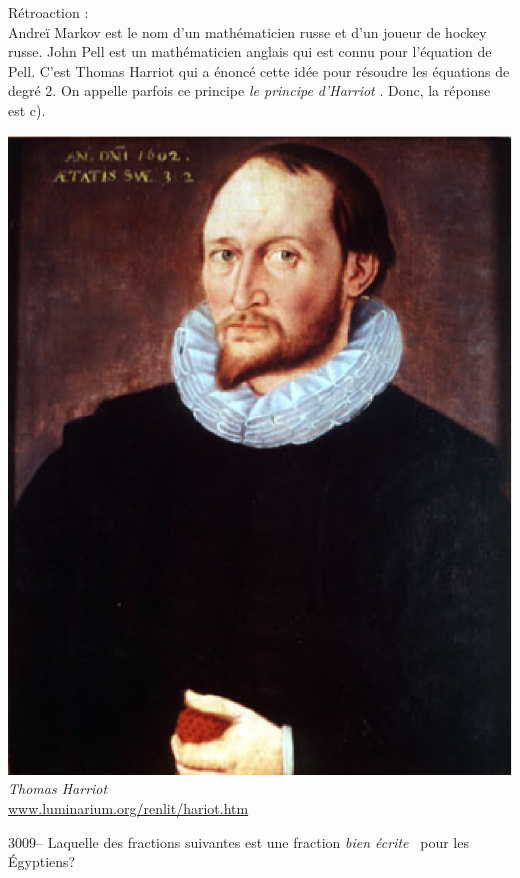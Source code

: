\documentclass[letterpaper, 12pt]{article}
\begin{document}
R\'etroaction :\\
Andre\"i Markov est le nom d'un math\'ematicien russe et d'un joueur de hockey russe. John Pell est un math\'ematicien anglais qui est connu pour l'\'equation de Pell. C'est Thomas Harriot qui a \'enonc\'e cette id\'ee pour r\'esoudre les \'equations de degr\'e 2. On appelle parfois ce principe \og \emph{le principe d'Harriot} \fg. Donc, la r\'eponse est c).\\
\begin{center}
\includegraphics[scale=0.25]{harriot.eps}\\
\emph{{\small Thomas Harriot}}\\
\href{http://www.luminarium.org/renlit/hariot.htm}{www.luminarium.org/renlit/hariot.htm}\\[5mm]
\end{center}



3009-- Laquelle des fractions suivantes est une fraction \og \emph{bien \'ecrite} \fg \ pour les \'Egyptiens?\\
\end{document}
